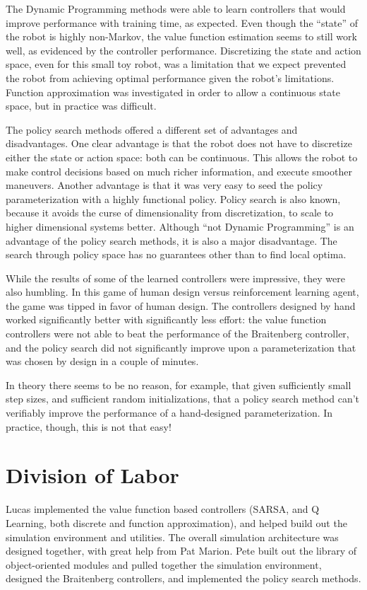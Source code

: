 \documentclass{article}
\begin{document}
The Dynamic Programming methods were able to learn controllers that would improve performance with training time, as expected.  Even though the ``state'' of the robot is highly non-Markov, the value function estimation seems to still work well, as evidenced by the controller performance.  Discretizing the state and action space, even for this small toy robot, was a limitation that we expect prevented the robot from achieving optimal performance given the robot's limitations.  Function approximation was investigated in order to allow a continuous state space, but in practice was difficult.

The policy search methods offered a different set of advantages and disadvantages.  One clear advantage is that the robot does not have to discretize either the state or action space: both can be continuous.  This allows the robot to make control decisions based on much richer information, and execute smoother maneuvers.  Another advantage is that it was very easy to seed the policy parameterization with a highly functional policy.  Policy search is also known, because it avoids the curse of dimensionality from discretization, to scale to higher dimensional systems better.  Although ``not Dynamic Programming'' is an advantage of the policy search methods, it is also a major disadvantage.  The search through policy space has no guarantees other than to find local optima.

While the results of some of the learned controllers were impressive, they were also humbling.  In this game of human design versus reinforcement learning agent, the game was tipped in favor of human design. The controllers designed by hand worked significantly better with significantly less effort:  the value function controllers were not able to beat the performance of the Braitenberg controller, and the policy search did not significantly improve upon a parameterization that was chosen by design in a couple of minutes.

In theory there seems to be no reason, for example, that given sufficiently small step sizes, and sufficient random initializations, that a policy search method can't verifiably improve the performance of a hand-designed parameterization.  In practice, though, this is not that easy!

\section{Division of Labor}

Lucas implemented the value function based controllers (SARSA, and Q Learning, both discrete and function approximation), and helped build out the simulation environment and utilities.  The overall simulation architecture was designed together, with great help from Pat Marion.  Pete built out the library of object-oriented modules and pulled together the simulation environment, designed the Braitenberg controllers, and implemented the policy search methods.
\end{document}
